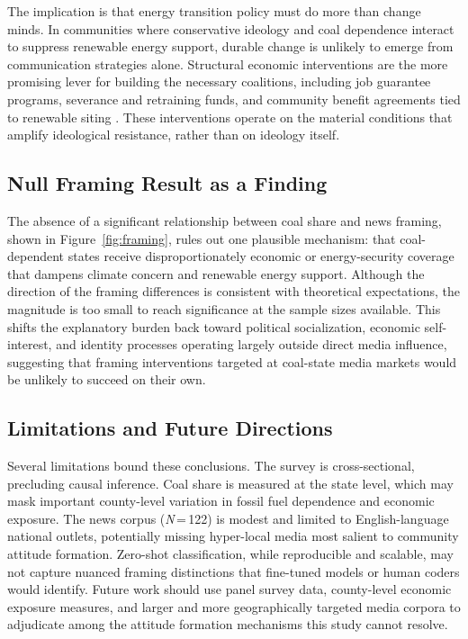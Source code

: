 \documentclass[9pt,twoside]{pnas-new}
\begin{document}
The implication is that energy transition policy must do more than change minds.
In communities where conservative ideology and coal dependence interact to
suppress renewable energy support, durable change is unlikely to emerge from
communication strategies alone. Structural economic interventions are the more
promising lever for building the necessary coalitions, including job guarantee
programs, severance and retraining funds, and community benefit agreements tied
to renewable siting \cite{Carley2020, Stokes2020}. These interventions operate
on the material conditions that amplify ideological resistance, rather than on
ideology itself.

\subsection*{Null Framing Result as a Finding}

The absence of a significant relationship between coal share and news framing,
shown in Figure~\ref{fig:framing}, rules out one plausible mechanism: that
coal-dependent states receive disproportionately economic or energy-security
coverage that dampens climate concern and renewable energy support. Although the
direction of the framing differences is consistent with theoretical expectations,
the magnitude is too small to reach significance at the sample sizes available.
This shifts the explanatory burden back toward political socialization,
economic self-interest, and identity processes operating largely outside direct
media influence, suggesting that framing interventions targeted at coal-state
media markets would be unlikely to succeed on their own.

\subsection*{Limitations and Future Directions}

Several limitations bound these conclusions. The survey is cross-sectional,
precluding causal inference. Coal share is measured at the state level, which
may mask important county-level variation in fossil fuel dependence and economic
exposure. The news corpus (\textit{N}\,=\,122) is modest and limited to
English-language national outlets, potentially missing hyper-local media most
salient to community attitude formation. Zero-shot classification, while
reproducible and scalable, may not capture nuanced framing distinctions that
fine-tuned models or human coders would identify. Future work should use panel
survey data, county-level economic exposure measures, and larger and more
geographically targeted media corpora to adjudicate among the attitude formation
mechanisms this study cannot resolve.
\end{document}
